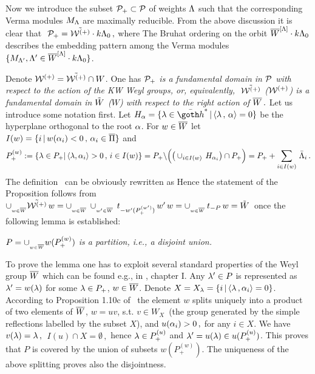 Now we introduce the subset ${\cal P}_+\subset{\cal P}$ of weights $\Lambda$
such that the corresponding Verma modules $M_\Lambda$ are maximally
reducible. {}From the above discussion it is clear that $\
{\cal P}_+=\tilde{{\cal W}^{(+)}}\cdot k\Lambda_0\,,$ where
%
\eqn{}
%
 The Bruhat ordering on the orbit
$\overline W^{[\Lambda]}\cdot k\Lambda_0$ describes the embedding pattern among the
Verma modules $\{ M_{\Lambda'},
\Lambda'\in  \overline W^{[\Lambda]}\cdot k\Lambda_0 \}$. 

Denote ${\cal W}^{(+)}=\tilde{{\cal W}^{(+)}}\cap W$. One has
 {\it ${\cal P}_+$ is a fundamental domain in ${\cal P}$  with
respect to the action of the KW Weyl groups, or, equivalently, $\
\tilde{{\cal W}^{(+)}}$ (${\cal W}^{(+)} $) is a fundamental domain in $\tilde W $ ($W$) with
respect to the right action of $\overline W \,.$}
\PROOF Let us introduce some notation first. Let   $H_{\za}=
\{\zl \in \bh^*\,| \, \la \zl\,,\, \za\ra=0  \}$ be
the hyperplane orthogonal to the root $\alpha$. 
 For $w\in\overline W$ let $I(w)=\{i \,|\, w(\alpha_i)<0\,,\, \alpha_i\in\overline\Pi\}$
and  
%
$$
P_+^{(w)}:= \{ \lambda \in P_+ |\, \langle\lambda,\alpha_i\rangle>0\,,\, 
i\in I(w) \} = P_+\backslash \Big(\big(\cup_{i\in I(w)}\,
H_{\alpha_i}\big)\cap P_+\Big) = P_+ +\sum_{i\in I(w)}\,\bar{\Lambda}_i \,.
$$
%
The definition \Ida\ can be obviously rewritten as 
%
\eqn\Id{
\tC =\{y \in \tW\,|\, y=w t_{-\zl}\,,
\,\,  w\in \bW\,, \,\, \zl \in P_+^{(w)} \} \,.
}
%
Hence the statement of the Proposition follows from $
\cup_{_{w\in \overline W }} \tilde{{\cal W}^{(+)}}\, w= \cup_{_{w\in \overline W }}\,\cup_{_{w'\in 
\overline W }}\, t_{-w'(P_+^{(w')})}\,w'\, w = \cup_{_{w\in \overline W }}\,
t_{-P}\, w = \tilde W\,$ once the following lemma is established:

{\it $P=\cup_{_{w\in \overline W }} w(P_+^{(w)})$ is a partition, i.e., a
disjoint union.}

\noindent
To prove the lemma one has to exploit several standard properties
of the Weyl group $\overline W$ which can be found e.g., in \Hump,
chapter I.
\PROOF 
Any $\lambda' \in P$ is represented as $\lambda'=w(\lambda)$ for some $\lambda\in
P_+$, $w\in \overline W$. Denote $X=X_{\lambda}=\{i\,|\, \langle \lambda \,, \alpha_i\rangle=0
\}$.  According to Proposition 1.10c of \Hump\ the element $w$
splits uniquely into a product of two elements of $\overline W$, $w=uv$,
s.t. $v\in W_X\,$ (the group generated by the simple reflections
labelled by the subset $X$), and $u(\alpha_i)>0\,,$ for any
$i\in X$. We have $v(\lambda)=\lambda\,,$ $\ I(u)\cap X = \emptyset\,,$ hence
$\lambda\in P^{(u)}_+$ and $\lambda'=u(\lambda)\in u(P^{(u)}_+)$.  This
proves that $P$ is covered by the union of subsets
$w(P^{(w)}_+)$.  The uniqueness of the above splitting proves
also  the disjointness.
\endPROOF
\medskip

